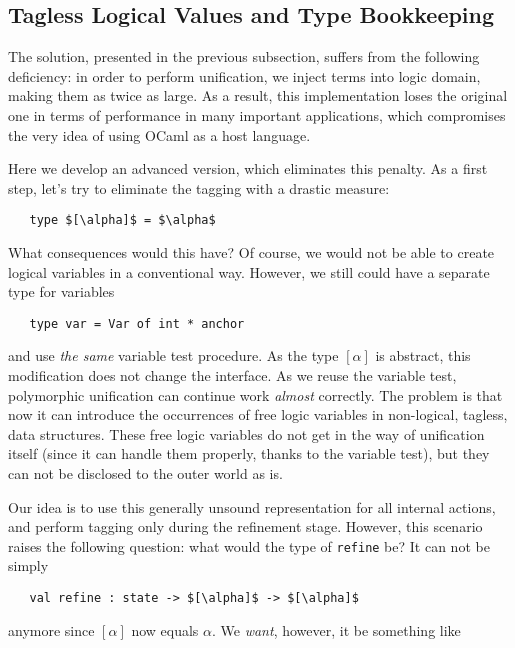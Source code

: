 \subsection{Tagless Logical Values and Type Bookkeeping}

The solution, presented in the previous subsection, suffers from the following deficiency: in order to perform unification,
we inject terms into logic domain, making them as twice as large. As a result, this implementation loses the original one in 
terms of performance in many important applications, which compromises the very idea of using OCaml as a host language.

Here we develop an advanced version, which eliminates this penalty. As a first step, let's try to eliminate the tagging with
a drastic measure:

\begin{lstlisting}
   type $[\alpha]$ = $\alpha$
\end{lstlisting}

What consequences would this have? Of course, we would not be able to create logical variables in a conventional way. However, 
we still could have a separate type for variables

\begin{lstlisting}
   type var = Var of int * anchor
\end{lstlisting}

and use \emph{the same} variable test procedure. As the type $[\alpha]$ is abstract, this modification does not change the interface. 
As we reuse the variable test, polymorphic unification can continue work \emph{almost} correctly. The problem is that
now it can introduce the occurrences of free logic variables in non-logical, tagless, data structures. These free logic variables 
do not get in the way of unification itself (since it can handle them properly, thanks to the variable test), but they can not
be disclosed to the outer world as is.

Our idea is to use this generally unsound representation for all internal actions, and perform tagging only during the refinement
stage. However, this scenario raises the following question: what would the type of \lstinline{refine} be? It can not be simply

\begin{lstlisting}
   val refine : state -> $[\alpha]$ -> $[\alpha]$
\end{lstlisting}

anymore since $[\alpha]$ now equals $\alpha$. We \emph{want}, however, it be something like

